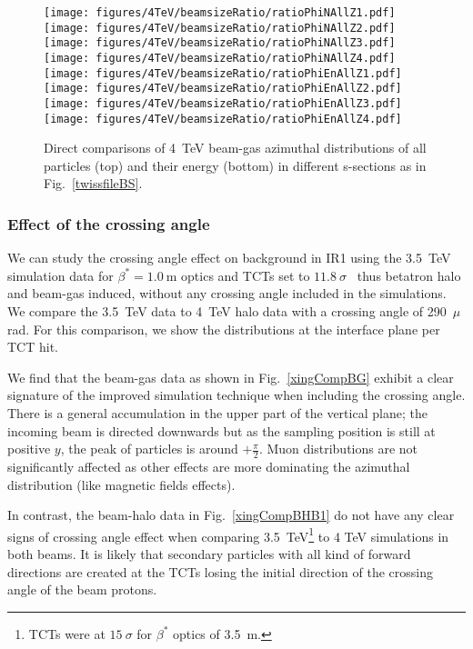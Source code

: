 \begin{figure}%
\begin{center}
  \texttt{[image: figures/4TeV/beamsizeRatio/ratioPhiNAllZ1.pdf]}
  \texttt{[image: figures/4TeV/beamsizeRatio/ratioPhiNAllZ2.pdf]}
  \texttt{[image: figures/4TeV/beamsizeRatio/ratioPhiNAllZ3.pdf]}
  \texttt{[image: figures/4TeV/beamsizeRatio/ratioPhiNAllZ4.pdf]}
  \texttt{[image: figures/4TeV/beamsizeRatio/ratioPhiEnAllZ1.pdf]}
  \texttt{[image: figures/4TeV/beamsizeRatio/ratioPhiEnAllZ2.pdf]}
  \texttt{[image: figures/4TeV/beamsizeRatio/ratioPhiEnAllZ3.pdf]}
  \texttt{[image: figures/4TeV/beamsizeRatio/ratioPhiEnAllZ4.pdf]}
\end{center}
\vspace{-0.6cm}
 \caption{Direct comparisons of 4~TeV beam-gas azimuthal distributions of all particles (top) and their energy (bottom) in different s-sections as in Fig.~\ref{twissfileBS}.
  \label{bsZAll}}
\end{figure}

 
\subsubsection{Effect of the crossing angle}

We can study the crossing angle effect on background in IR1 using the 3.5~TeV simulation data for $\beta^* = 1.0~$m optics and TCTs set to $11.8~\sigma$~\cite{nimPaperRod} thus betatron halo and beam-gas induced, without any crossing angle included in the simulations. We compare the 3.5~TeV data to 4~TeV halo data with a crossing angle of 290~$\mu$rad. For this comparison, we show the distributions at the interface plane per TCT hit. 

We find that the beam-gas data as shown in Fig.~\ref{xingCompBG} exhibit a clear signature of the improved simulation technique when including the crossing angle. There is a general accumulation in the upper part of the vertical plane; the incoming beam is directed downwards but as the sampling position is still at positive $y$, the peak of particles is around $+ \frac{\pi}{2}$. Muon distributions are not significantly affected as other effects are more dominating the azimuthal distribution (like magnetic fields effects). 

In contrast, the beam-halo data in Fig.~\ref{xingCompBHB1} do not have any clear signs of crossing angle effect when comparing 3.5~TeV\footnote{TCTs were at $15~\sigma$ for $\beta^*$ optics of 3.5~m.} to 4 TeV simulations in both beams. It is likely that secondary particles with all kind of forward directions are created at the TCTs losing the initial direction of the crossing angle of the beam protons.

